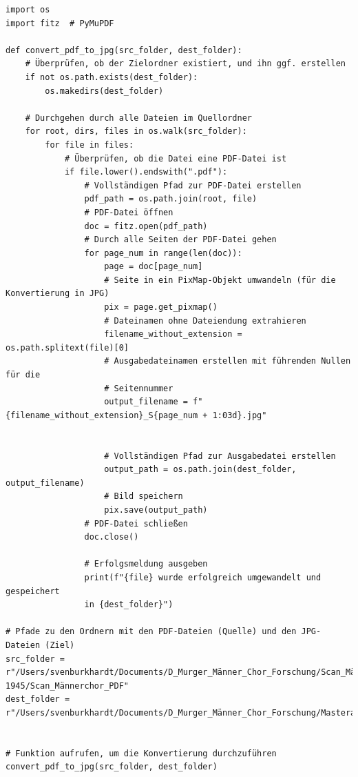 \documentclass[12pt, a4paper, ngerman, bidi=default]{article}
\begin{document}
\begin{verbatim}
import os
import fitz  # PyMuPDF

def convert_pdf_to_jpg(src_folder, dest_folder):
    # Überprüfen, ob der Zielordner existiert, und ihn ggf. erstellen
    if not os.path.exists(dest_folder):
        os.makedirs(dest_folder)

    # Durchgehen durch alle Dateien im Quellordner
    for root, dirs, files in os.walk(src_folder):
        for file in files:
            # Überprüfen, ob die Datei eine PDF-Datei ist
            if file.lower().endswith(".pdf"):
                # Vollständigen Pfad zur PDF-Datei erstellen
                pdf_path = os.path.join(root, file)
                # PDF-Datei öffnen
                doc = fitz.open(pdf_path)
                # Durch alle Seiten der PDF-Datei gehen
                for page_num in range(len(doc)):
                    page = doc[page_num]
                    # Seite in ein PixMap-Objekt umwandeln (für die Konvertierung in JPG)
                    pix = page.get_pixmap()
                    # Dateinamen ohne Dateiendung extrahieren
                    filename_without_extension = os.path.splitext(file)[0]
                    # Ausgabedateinamen erstellen mit führenden Nullen für die 
                    # Seitennummer
                    output_filename = f"{filename_without_extension}_S{page_num + 1:03d}.jpg"


                    # Vollständigen Pfad zur Ausgabedatei erstellen
                    output_path = os.path.join(dest_folder, output_filename)
                    # Bild speichern
                    pix.save(output_path)
                # PDF-Datei schließen
                doc.close()
                
                # Erfolgsmeldung ausgeben
                print(f"{file} wurde erfolgreich umgewandelt und gespeichert
                in {dest_folder}")

# Pfade zu den Ordnern mit den PDF-Dateien (Quelle) und den JPG-Dateien (Ziel)
src_folder = r"/Users/svenburkhardt/Documents/D_Murger_Männer_Chor_Forschung/Scan_Männerchor/Männerchor_Akten_1925–1945/Scan_Männerchor_PDF"
dest_folder = r"/Users/svenburkhardt/Documents/D_Murger_Männer_Chor_Forschung/Masterarbeit/JPEG_Akten_Scans"


# Funktion aufrufen, um die Konvertierung durchzuführen
convert_pdf_to_jpg(src_folder, dest_folder)

\end{verbatim}
\newpage
\end{document}
